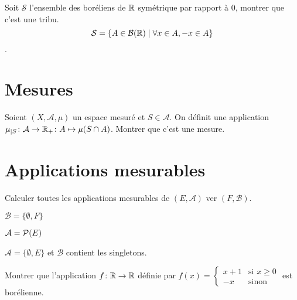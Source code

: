 \documentclass[french]{report}
\begin{document}
\begin{exo}
    Soit \(\mathcal{S}\) l'ensemble des boréliens de \(\R\) symétrique par
    rapport à \(0\), montrer que c'est une tribu. \[\mathcal{S}=\{A\in\bor\mid \forall x\in A, -x\in A\}\].
\end{exo}

\section*{Mesures}

\begin{exo}
    Soient \(\left(X,\mathcal{A},\mu\right)\) un espace mesuré et \(S\in \mathcal{A}\).
    On définit une application \(\mu_{\mid S}\colon \mathcal{A}\to \R_+\colon A\mapsto \mu(S\cap A)\).
    Montrer que c'est une mesure.
\end{exo}

\section*{Applications mesurables}

\begin{exo}
    Calculer toutes les applications mesurables de \(\left(E, \mathcal{A}\right)\)
    ver \(\left(F, \mathcal{B}\right)\).
    \begin{q}{1}
        \(\mathcal{B} = \{\emptyset, F\}\)
    \end{q}
    \begin{q}{2}
        \(\mathcal{A}=\pow[E]\)
    \end{q}
    \begin{q}{3}
        \(\mathcal{A} = \{\emptyset, E\}\) et \(\mathcal{B}\) contient les singletons.
    \end{q}
\end{exo}

\begin{exo}
    Montrer que l'application \(f\colon\R\to\R\) définie par
    \(f(x)=\begin{cases}
        x+1&\text{si }x\geq 0\\
        -x&\text{sinon}
    \end{cases}\) est borélienne.
\end{exo}
\end{document}
